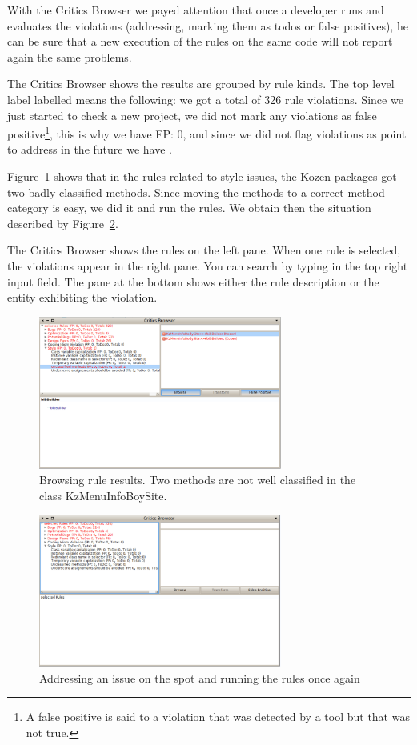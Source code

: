 \documentclass[a4paper,10pt,twoside]{book}
\begin{document}
With the Critics Browser we payed attention that once a developer runs and evaluates the violations (\ie addressing, marking them as todos or false positives), he can be sure that a new execution of the rules on the same code will not report again the same problems. 


The Critics Browser shows the results are grouped by rule kinds. 
The top level label labelled  means the following: we got a total of 326 rule violations. Since we just started to check a new project, we did not mark any violations as false positive\footnote{A false positive is said to a violation that was detected by a tool but that was not true.}, this is why we have FP: 0, and since we did not flag violations as point to address in the future we have .


Figure~\ref{unclassified} shows that in the rules related to style issues, the Kozen packages got two badly classified methods. Since moving the methods to a correct method category is easy, we did it and run the rules. We obtain then the situation described by Figure~\ref{reapplying}.

The Critics Browser shows the rules on the left pane. When one rule is selected, the violations appear in the right pane. You can search by typing in the top right input field. The pane at the bottom shows either the rule description or the entity exhibiting the violation. 

\begin{figure}[h]
\centering
\includegraphics[width=8cm]{UnclassifiedMethods}
\caption{Browsing rule results. Two methods are not well classified in the class KzMenuInfoBoySite.\label{unclassified}}
\end{figure}


\begin{figure}[h]
\centering
\includegraphics[width=8cm]{ReapplyingTheRulesAfterAChange}
\caption{Addressing an issue on the spot and running the rules once again\label{reapplying}}
\end{figure}
\end{document}

